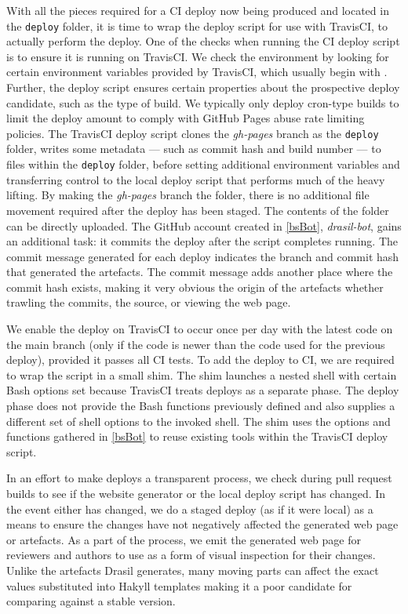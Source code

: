 {{{{{With all the pieces required for a CI deploy now being produced and located in the \texttt{deploy} folder, it is time to wrap the deploy script for use with TravisCI, to actually perform the deploy. One of the checks when running the CI deploy script is to ensure it is running on TravisCI. We check the environment by looking for certain environment variables provided by TravisCI, which usually begin with . Further, the deploy script ensures certain properties about the prospective deploy candidate, such as the type of build. We typically only deploy cron-type builds to limit the deploy amount to comply with GitHub Pages abuse rate limiting policies. The TravisCI deploy script clones the \textit{gh-pages} branch as the \texttt{deploy} folder, writes some metadata --- such as commit hash and build number --- to files within the \texttt{deploy} folder, before setting additional environment variables and transferring control to the local deploy script that performs much of the heavy lifting. By making the \textit{gh-pages} branch the  folder, there is no additional file movement required after the deploy has been staged. The contents of the  folder can be directly uploaded. The GitHub account created in \autoref{bsBot}, \textit{drasil-bot}, gains an additional task: it commits the deploy after the script completes running. The commit message generated for each deploy indicates the branch and commit hash that generated the artefacts. The commit message adds another place where the commit hash exists, making it very obvious the origin of the artefacts whether trawling the commits, the source, or viewing the web page. 

We enable the deploy on TravisCI to occur once per day with the latest code on the main branch (only if the code is newer than the code used for the previous deploy), provided it passes all CI tests. To add the deploy to CI, we are required to wrap the script in a small shim. The shim launches a nested shell with certain Bash options set because TravisCI treats deploys as a separate phase. The deploy phase does not provide the Bash functions previously defined and also supplies a different set of shell options to the invoked shell. The shim uses the options and functions gathered in \autoref{bsBot} to reuse existing tools within the TravisCI deploy script. 

In an effort to make deploys a transparent process, we check during pull request builds to see if the website generator or the local deploy script has changed. In the event either has changed, we do a staged deploy (as if it were local) as a means to ensure the changes have not negatively affected the generated web page or artefacts. As a part of the process, we emit the generated web page for reviewers and authors to use as a form of visual inspection for their changes. Unlike the artefacts Drasil generates, many moving parts can affect the exact values substituted into Hakyll templates making it a poor candidate for comparing against a stable version.

}}}}}
